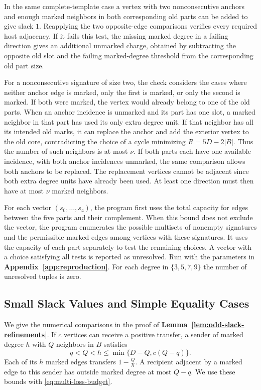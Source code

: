 \documentclass[preprint,11pt,numbers]{elsarticle-arxiv}
\numberwithin{equation}{section}
\theoremstyle{definition}
\begin{document}
In the same complete-template case a
vertex with two nonconsecutive anchors and enough marked neighbors
in both corresponding old parts can be added to give slack $1$.
Reapplying the two opposite-edge comparisons verifies every
required host adjacency. If it fails this test, the missing marked
degree in a failing direction gives an additional unmarked charge,
obtained by subtracting the opposite old slot and the failing
marked-degree threshold from the corresponding old part size.

For a nonconsecutive signature of size two, the check considers
the cases where neither anchor edge is marked, only the first is
marked, or only the second is marked. If both were marked, the
vertex would already belong to one of the old parts.
When an anchor incidence is unmarked and its part has one slot, a
marked neighbor in that part has used its only extra degree unit.
If that neighbor has all its intended old marks, it can replace the
anchor and add the exterior vertex to the old core, contradicting the
choice of a cycle minimizing $R=5D-2|B|$. Thus the number of such neighbors is at most
$\nu$. If both parts each have one available incidence, with both anchor incidences unmarked,
the same comparison allows both anchors to be replaced. The replacement vertices
cannot be adjacent since both extra degree units have already been used.
At least one direction must then have at most $\nu$ marked neighbors.

For each vector $(s_0,\ldots,s_4)$, the program first uses the total
capacity for edges between the five parts and their complement.
When this bound does not exclude the vector, the program enumerates
the possible multisets of nonempty signatures and the permissible
marked edges among vertices with these signatures. It uses the
capacity of each part separately to test the remaining choices.
A vector with a choice satisfying all tests is reported as unresolved.
Run
 with the parameters in
\textbf{Appendix~\ref{app:reproduction}}. For each degree in
$\{3,5,7,9\}$ the number of unresolved tuples is zero.
\relax\space%
\subsection{Small Slack Values and Simple Equality Cases}
\label{app:multi-structure}

We give the numerical comparisons in the proof of
\textbf{Lemma~\ref{lem:odd-slack-refinements}}. If $c$ vertices
can receive a positive transfer, a sender of marked degree $h$ with
$Q$ neighbors in $B$ satisfies
\[
  q<Q<h\le\min\{D-Q,c(Q-q)\}.
\]
Each of its $h$ marked edges transfers $1-\frac{Q}{h}$. A recipient
adjacent by a marked edge to this sender has outside marked degree
at most $Q-q$. We use these bounds with \eqref{eq:multi-loss-budget}.
\end{document}
